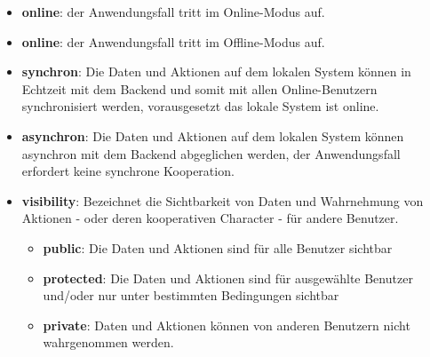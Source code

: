 \begin{itemize}[leftmargin=*,noitemsep,topsep=1ex,parsep=0pt,partopsep=0pt]
\item \textbf{online}: der Anwendungsfall tritt im Online-Modus auf.
\item \textbf{online}: der Anwendungsfall tritt im Offline-Modus auf.
\item \textbf{synchron}: Die Daten und Aktionen auf dem lokalen System können in Echtzeit mit dem Backend und somit mit allen Online-Benutzern synchronisiert werden, vorausgesetzt das lokale System ist online. 
\item \textbf{asynchron}: Die Daten und Aktionen auf dem lokalen System können asynchron mit dem Backend abgeglichen werden, der Anwendungsfall erfordert keine synchrone Kooperation.
\item \textbf{visibility}: Bezeichnet die Sichtbarkeit von Daten und Wahrnehmung von Aktionen - oder deren kooperativen Character - für andere Benutzer.
	\begin{itemize}[leftmargin=*,noitemsep,topsep=1ex,parsep=0pt,partopsep=0pt]
\renewcommand{\labelitemii}{\textbf{+}}
		\item \textbf{public}: Die Daten und Aktionen sind für alle Benutzer sichtbar
\renewcommand{\labelitemii}{\textbf{\#}}
		\item \textbf{protected}: Die Daten und Aktionen sind für ausgewählte Benutzer und/oder nur unter bestimmten Bedingungen sichtbar
\renewcommand{\labelitemii}{\textbf{-}}
		\item \textbf{private}: Daten und Aktionen können von anderen Benutzern nicht wahrgenommen werden.
	\end{itemize}
\end{itemize}


